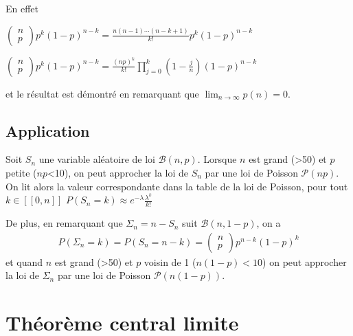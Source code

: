\documentclass[letterpaper,10pt,english]{jupyterBook}
\begin{document}
\sphinxAtStartPar
En effet

\sphinxAtStartPar
\(\begin{pmatrix}n\\p\end{pmatrix} p^k(1-p)^{n-k}=\frac{n(n-1)\cdots (n-k+1)}{k!}p^k(1-p)^{n-k}\)

\sphinxAtStartPar
\(\begin{pmatrix}n\\p\end{pmatrix} p^k(1-p)^{n-k}=\frac{(np)^k}{k!}\displaystyle\prod_{j=0}^k\left (1-\frac{j}{n}\right )(1-p)^{n-k}\)

\sphinxAtStartPar
et le résultat est démontré en remarquant que \(\displaystyle\lim_{n\rightarrow\infty} p(n)=0\).


\subsection{Application}
\label{\detokenize{elemstats:application}}
\sphinxAtStartPar
Soit \(S_n\) une variable aléatoire de loi \(\mathcal{B}(n,p)\). Lorsque \(n\) est grand (>50) et \(p\) petite (\(np\)<10), on peut approcher la loi de \(S_n\) par une loi de Poisson \(\mathcal P(np)\). On lit alors la valeur correspondante dans la table de la loi de Poisson, pour tout \(k\in[\![0,n]\!]\)
\(P(S_n=k)\approx e^{-\lambda}\frac{\lambda^k}{k!}\)

\sphinxAtStartPar
De plus, en remarquant que \(\Sigma_n=n-S_n\) suit \(\mathcal{B}(n,1-p)\), on a
\begin{equation*}
\begin{split}P(\Sigma_n=k)=P(S_n=n-k)=\begin{pmatrix}n\\p\end{pmatrix} p^{n-k}(1-p)^{k} \end{split}
\end{equation*}
\sphinxAtStartPar
et quand \(n\) est grand (>50) et \(p\) voisin de 1 (\(n(1-p)<10\)) on peut approcher la loi de \(\Sigma_n\) par une loi de Poisson \(\mathcal P(n(1-p))\).


\section{Théorème central limite}
\label{\detokenize{elemstats:theoreme-central-limite}}
\end{document}
